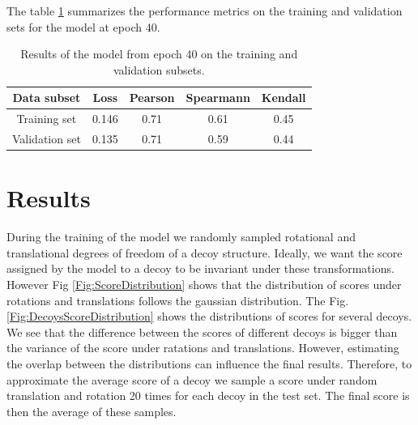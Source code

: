 \documentclass[letter,10pt]{article}
\begin{document}
The table \ref{Tbl:TrainingResults} summarizes the performance metrics on the training and validation sets for the model at epoch 40.

\begin{table}[H]
\begin{center}
\begin{tabular}{ c | c | c | c | c }
    Data subset & Loss & Pearson & Spearmann & Kendall \\
    \hline
    Training set     &0.146 &0.71 &0.61 &0.45 \\
    Validation set   &0.135 &0.71 &0.59 &0.44 \\ \hline

\end{tabular}
  \caption {Results of the model from epoch 40 on the training and validation subsets.}
    \label{Tbl:TrainingResults}
\end{center}
\end{table}

\section{Results}
During the training of the model we randomly sampled rotational and translational degrees of freedom of a decoy structure. Ideally, we 
want the score assigned by the model to a decoy to be invariant under these transformations. However Fig \ref{Fig:ScoreDistribution} 
shows that the distribution
of scores under rotations and translations follows the gaussian distribution. The Fig. \ref{Fig:DecoysScoreDistribution} 
shows the distributions of scores for several decoys. We see that the difference between the scores of different decoys is 
bigger than the variance of the score under ratations and translations. However, estimating the overlap between 
the distributions can influence the final results. Therefore, to approximate the average score of a decoy we 
sample a score under random translation and rotation 20 times for each decoy in the test set. The final score is then the average of these 
samples.
\end{document}
